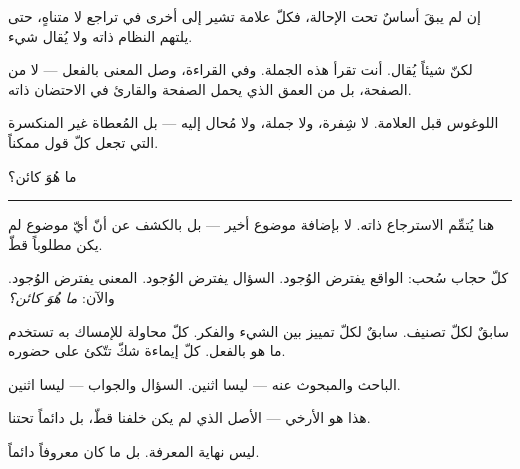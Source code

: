 \documentclass[10pt, openany, oneside]{book}
\begin{document}
\vspace{0.5em}

\noindent إن لم يبقَ أساسٌ تحت الإحالة، فكلّ علامة تشير إلى أخرى في تراجع لا متناهٍ، حتى يلتهم النظام ذاته ولا يُقال شيء.

\vspace{0.5em}

\noindent لكنّ شيئاً يُقال. أنت تقرأ هذه الجملة. وفي القراءة، وصل المعنى بالفعل --- لا من الصفحة، بل من العمق الذي يحمل الصفحة والقارئ في الاحتضان ذاته.

\vspace{0.5em}

\noindent اللوغوس قبل العلامة. لا شِفرة، ولا جملة، ولا مُحال إليه --- بل المُعطاة غير المنكسرة التي تجعل كلّ قول ممكناً.

\vspace{2em}

\begin{center}
    {\scshape ما هُوَ كائن؟}\\[0.3em]
    \rule{0.2\textwidth}{0.3pt}
\end{center}

\vspace{1em}

\noindent هنا يُتمِّم الاسترجاع ذاته. لا بإضافة موضوع أخير --- بل بالكشف عن أنّ أيّ موضوع لم يكن مطلوباً قطّ.

\vspace{0.5em}

\noindent كلّ حجاب سُحب: الواقع يفترض الوُجود. السؤال يفترض الوُجود. المعنى يفترض الوُجود. والآن: \textit{ما هُوَ كائن؟}

\vspace{0.5em}

\noindent سابقٌ لكلّ تصنيف. سابقٌ لكلّ تمييز بين الشيء والفكر. كلّ محاولة للإمساك به تستخدم ما هو بالفعل. كلّ إيماءة شكّ تتّكئ على حضوره.

\vspace{0.5em}

\noindent الباحث والمبحوث عنه --- ليسا اثنين. السؤال والجواب --- ليسا اثنين.

\vspace{0.5em}

\noindent هذا هو الأرخي --- الأصل الذي لم يكن خلفنا قطّ، بل دائماً تحتنا.

\vspace{0.5em}

\noindent ليس نهاية المعرفة. بل ما كان معروفاً دائماً.

\vspace{2em}
\end{document}
